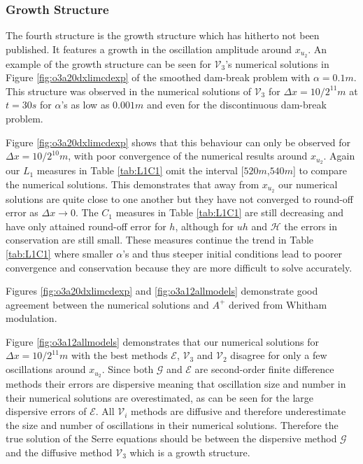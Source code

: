 \documentclass[times]{elsarticle}
\begin{document}
\subsubsection{Growth Structure}
The fourth structure is the growth structure which has hitherto not been published. It features a growth in the oscillation amplitude around $x_{u_2}$. An example of the growth structure can be seen for $\mathcal{V}_3$'s numerical solutions in Figure \ref{fig:o3a20dxlimcdexp} of the smoothed dam-break problem with $\alpha = 0.1m$. This structure was observed in the numerical solutions of $\mathcal{V}_3$ for $\Delta x = 10/2^{11}m$ at $t=30s$ for $\alpha$'s as low as $0.001m$ and even for the discontinuous dam-break problem.

Figure \ref{fig:o3a20dxlimcdexp} shows that this behaviour can only be observed for $\Delta x = 10 / 2^{10}m$, with poor convergence of the numerical results around $x_{u_2}$. Again our $L_1$ measures in Table \ref{tab:L1C1} omit the interval [$520m$,$540m$] to compare the numerical solutions. This demonstrates that away from $x_{u_2}$ our numerical solutions are quite close to one another but they have not converged to round-off error as $\Delta x \rightarrow 0$. The $C_1$ measures in Table \ref{tab:L1C1} are still decreasing and have only attained round-off error for $h$, although for $uh$ and $\mathcal{H}$ the errors in  conservation are still small. These measures continue the trend in Table \ref{tab:L1C1} where smaller $\alpha$'s and thus steeper initial conditions lead to poorer convergence and conservation because they are more difficult to solve accurately.

Figures \ref{fig:o3a20dxlimcdexp} and \ref{fig:o3a12allmodels} demonstrate good agreement between the numerical solutions and $A^+$ derived from Whitham modulation.

Figure \ref{fig:o3a12allmodels} demonstrates that our numerical solutions for $\Delta x = 10 /2^{11}m$ with the best methods $\mathcal{E}$, $\mathcal{V}_3$ and $\mathcal{V}_2$ disagree for only a few oscillations around $x_{u_2}$. Since both $\mathcal{G}$ and $\mathcal{E}$ are second-order finite difference methods their errors are dispersive meaning that oscillation size and number in their numerical solutions are overestimated, as can be seen for the large dispersive errors of $\mathcal{E}$. All $\mathcal{V}_i$ methods are diffusive and therefore underestimate the size and number of oscillations in their numerical solutions. Therefore the true solution of the Serre equations should be between the dispersive method $\mathcal{G}$ and the diffusive method $\mathcal{V}_3$ which is a growth structure. 
\end{document}
